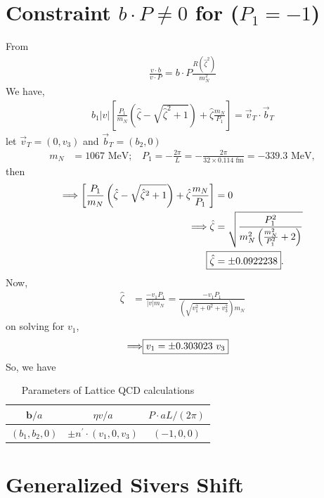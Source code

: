 \documentclass[]{article}
\numberwithin{equation}{section}
\newcommand{\tcdot}{{\cdot}}
\newcommand{\vect}[1]{\ensuremath{\boldsymbol{#1}}}
\newcommand{\bvec}{b}
\newcommand{\mN}{m_N}
\newcommand{\zetahat}{{\hat \zeta}}
\begin{document}
\section{ Constraint $b\cdot P \neq 0$ for ($P_1=-1$)}
From
\begin{align}
    \frac{v \tcdot b}{v \tcdot P} = b \tcdot P \frac{R(\zetahat^2)}{\mN^2}
\end{align}
We have,
\begin{align}
    b_{1}|v|\left[\frac{P_{1}}{m_{N}}\left(\hat{\zeta}-\sqrt{\hat{\zeta}^2+1}\right)+\hat{\zeta}\frac{m_{N}}{P_{1}}\right]=\vec{v}_{T}\cdot\vec{b}_{T}
\end{align}
let $\vec{v}_{T}=(0,v_{3})$ and $\vec{b}_{T}=(b_{2},0)$
\begin{align}
    \mN &= 1067\text{ MeV};~~~~P_{1}=-\frac{2\pi}{L}=-\frac{2\pi}{32\times 0.114\text{ fm}}=-339.3\text{ MeV},
\end{align}
then
\begin{align}
   \Longrightarrow \left[\frac{P_{1}}{m_{N}}\left(\hat{\zeta}-\sqrt{\hat{\zeta}^2+1}\right)+\hat{\zeta}\frac{m_{N}}{P_{1}}\right]&=0\\
    \Longrightarrow \hat{\zeta} &=\sqrt{\frac{P_{1}^2}{m_{N}^{2}\left(\frac{m_{N}^{2}}{P_{1}^{2}}+2\right)}}\\
    \Aboxed{\hat{\zeta} &= \pm 0.0922238}.
\end{align}
Now,
\begin{align}
    \hat{\zeta}&=\frac{-v_{1}P_{1}}{|v|\mN}=\frac{-v_{1}P_{1}}{\left(\sqrt{v_{1}^{2}+0^{2}+v_{3}^{2}}\right)m_{N}}
\end{align}
on solving for $v_{1}$,
\begin{align}
    \Longrightarrow\Aboxed{v_{1}=\pm 0.303023~v_{3}}
\end{align}
So, we have
\begin{table}[h!]
    \centering
    \begin{tabular}{|c|c|c|}
    \hline
       $\vect{\bvec}/a$  &  $\eta v/a$ & $P\cdot aL/(2\pi)$\\
       \hline
        $(b_{1},b_{2},0)$ & $\pm n^{\prime}\cdot(v_{1},0,v_{3})$  & $(-1,0,0)$\\
        \hline
    \end{tabular}
    \caption{Parameters of Lattice QCD calculations}
    \label{tab:my_label}
\end{table}

\section{Generalized Sivers Shift}
\end{document}
